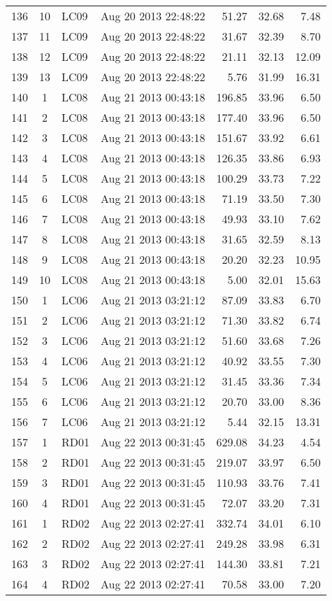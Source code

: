 \begin{longtable}{ccllrrr}
136&10&LC09&Aug 20 2013 22:48:22&51.27&32.68&7.48\\
137&11&LC09&Aug 20 2013 22:48:22&31.67&32.39&8.70\\
138&12&LC09&Aug 20 2013 22:48:22&21.11&32.13&12.09\\
139&13&LC09&Aug 20 2013 22:48:22&5.76&31.99&16.31\\
\hline 
140&1&LC08&Aug 21 2013 00:43:18&196.85&33.96&6.50\\
141&2&LC08&Aug 21 2013 00:43:18&177.40&33.96&6.50\\
142&3&LC08&Aug 21 2013 00:43:18&151.67&33.92&6.61\\
143&4&LC08&Aug 21 2013 00:43:18&126.35&33.86&6.93\\
144&5&LC08&Aug 21 2013 00:43:18&100.29&33.73&7.22\\
145&6&LC08&Aug 21 2013 00:43:18&71.19&33.50&7.30\\
146&7&LC08&Aug 21 2013 00:43:18&49.93&33.10&7.62\\
147&8&LC08&Aug 21 2013 00:43:18&31.65&32.59&8.13\\
148&9&LC08&Aug 21 2013 00:43:18&20.20&32.23&10.95\\
149&10&LC08&Aug 21 2013 00:43:18&5.00&32.01&15.63\\
\hline 
150&1&LC06&Aug 21 2013 03:21:12&87.09&33.83&6.70\\
151&2&LC06&Aug 21 2013 03:21:12&71.30&33.82&6.74\\
152&3&LC06&Aug 21 2013 03:21:12&51.60&33.68&7.26\\
153&4&LC06&Aug 21 2013 03:21:12&40.92&33.55&7.30\\
154&5&LC06&Aug 21 2013 03:21:12&31.45&33.36&7.34\\
155&6&LC06&Aug 21 2013 03:21:12&20.70&33.00&8.36\\
156&7&LC06&Aug 21 2013 03:21:12&5.44&32.15&13.31\\
\hline 
157&1&RD01&Aug 22 2013 00:31:45&629.08&34.23&4.54\\
158&2&RD01&Aug 22 2013 00:31:45&219.07&33.97&6.50\\
159&3&RD01&Aug 22 2013 00:31:45&110.93&33.76&7.41\\
160&4&RD01&Aug 22 2013 00:31:45&72.07&33.20&7.31\\
\hline 
161&1&RD02&Aug 22 2013 02:27:41&332.74&34.01&6.10\\
162&2&RD02&Aug 22 2013 02:27:41&249.28&33.98&6.31\\
163&3&RD02&Aug 22 2013 02:27:41&144.30&33.81&7.21\\
164&4&RD02&Aug 22 2013 02:27:41&70.58&33.00&7.20\\

\end{longtable}
